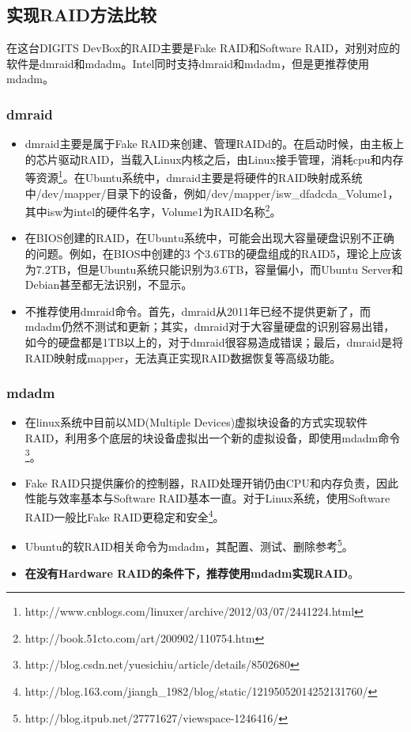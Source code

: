 \subsection{实现RAID方法比较}
在这台DIGITS DevBox的RAID主要是Fake RAID和Software RAID，对别对应的软件是dmraid和mdadm。Intel同时支持dmraid和mdadm，但是更推荐使用mdadm。
\subsubsection{dmraid}
\begin{itemize}
\item dmraid主要是属于Fake RAID来创建、管理RAIDd的。在启动时候，由主板上的芯片驱动RAID，当载入Linux内核之后，由Linux接手管理，消耗cpu和内存等资源\footnote{http://www.cnblogs.com/linuxer/archive/2012/03/07/2441224.html}。在Ubuntu系统中，dmraid主要是将硬件的RAID映射成系统中/dev/mapper/目录下的设备，例如/dev/mapper/isw\_dfadcda\_Volume1，其中isw为intel的硬件名字，Volume1为RAID名称\footnote{http://book.51cto.com/art/200902/110754.htm}。
\item 在BIOS创建的RAID，在Ubuntu系统中，可能会出现大容量硬盘识别不正确的问题。例如，在BIOS中创建的3 个3.6TB的硬盘组成的RAID5，理论上应该为7.2TB，但是Ubuntu系统只能识别为3.6TB，容量偏小，而Ubuntu Server和Debian甚至都无法识别，不显示。
\item 不推荐使用dmraid命令。首先，dmraid从2011年已经不提供更新了，而mdadm仍然不测试和更新；其实，dmraid对于大容量硬盘的识别容易出错，如今的硬盘都是1TB以上的，对于dmraid很容易造成错误；最后，dmraid是将RAID映射成mapper，无法真正实现RAID数据恢复等高级功能。
\end{itemize}

\subsubsection{mdadm}
\begin{itemize}
\item 在linux系统中目前以MD(Multiple Devices)虚拟块设备的方式实现软件RAID，利用多个底层的块设备虚拟出一个新的虚拟设备，即使用mdadm命令\footnote{http://blog.csdn.net/yuesichiu/article/details/8502680}。
\item Fake RAID只提供廉价的控制器，RAID处理开销仍由CPU和内存负责，因此性能与效率基本与Software RAID基本一直。对于Linux系统，使用Software RAID一般比Fake RAID更稳定和安全\footnote{http://blog.163.com/jiangh\_1982/blog/static/12195052014252131760/}。
\item Ubuntu的软RAID相关命令为mdadm，其配置、测试、删除参考\footnote{http://blog.itpub.net/27771627/viewspace-1246416/}。 
\item \textbf{在没有Hardware RAID的条件下，推荐使用mdadm实现RAID}。
\end{itemize}



